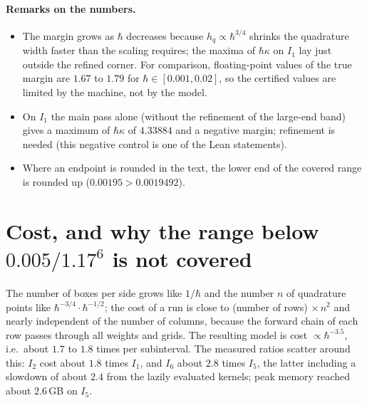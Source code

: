 \documentclass[11pt,a4paper]{article}
\theoremstyle{definition}
\theoremstyle{remark}
\newcommand{\hk}{\hbar\kappa}
\begin{document}
\paragraph{Remarks on the numbers.}
\begin{itemize}[leftmargin=2em]
\item The margin grows as $\hbar$ decreases because $h_q\propto\hbar^{3/4}$ shrinks the quadrature width faster than the scaling requires; the maxima of $\hk$ on $I_1$ lay just outside the refined corner. For comparison, floating-point values of the true margin are $1.67$ to $1.79$ for $\hbar\in[0.001,0.02]$, so the certified values are limited by the machine, not by the model.
\item On $I_1$ the main pass alone (without the refinement of the large-end band) gives a maximum of $\hk$ of $4.33884$ and a negative margin; refinement is needed (this negative control is one of the Lean statements).
\item Where an endpoint is rounded in the text, the lower end of the covered range is rounded up ($0.00195>0.0019492$).
\end{itemize}

\section{Cost, and why the range below \texorpdfstring{$0.005/1.17^6$}{0.005/1.17\^{}6} is not covered}\label{sec:cost}

The number of boxes per side grows like $1/\hbar$ and the number $n$ of quadrature points like $\hbar^{-3/4}\cdot\hbar^{-1/2}$; the cost of a run is close to (number of rows)$\,\times n^2$ and nearly independent of the number of columns, because the forward chain of each row passes through all weights and grids. The resulting model is cost $\propto\hbar^{-3.5}$, i.e.\ about $1.7$ to $1.8$ times per subinterval. The measured ratios scatter around this: $I_2$ cost about $1.8$ times $I_1$, and $I_6$ about $2.8$ times $I_5$, the latter including a slowdown of about $2.4$ from the lazily evaluated kernels; peak memory reached about $2.6$\,GB on $I_5$.
\end{document}
